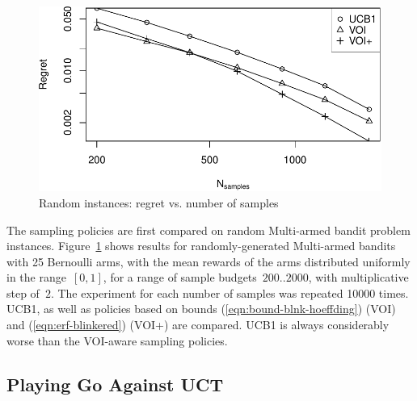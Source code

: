 \documentclass[]{article}
\begin{document}
\begin{figure}[h!]
\centering
\includegraphics[scale=0.6]{flat.pdf}
\caption{Random instances: regret vs. number of samples}
\label{fig:random-instances}
\end{figure}

The sampling policies are first compared on random Multi-armed bandit 
problem instances. Figure~\ref{fig:random-instances} shows results for
randomly-generated Multi-armed bandits with 25 Bernoulli arms, with
the mean rewards of the arms distributed uniformly in the range~$[0,
  1]$, for a range of sample budgets~$200..2000$, with multiplicative
step of~$2$. The experiment for each number of samples was repeated
10000 times. UCB1, as well as policies  based on bounds
(\ref{eqn:bound-blnk-hoeffding}) (VOI) and
(\ref{eqn:erf-blinkered}) (VOI+) are compared. UCB1 is always considerably worse than the
VOI-aware sampling policies.

\subsection{Playing Go Against UCT}
\label{sec:emp-go}
\end{document}
